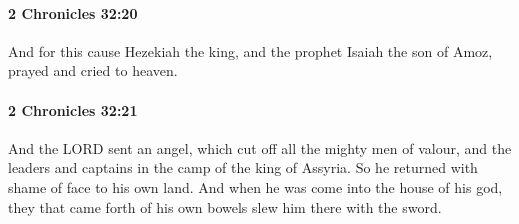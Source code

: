 		\paragraph{2 Chronicles 32:20} %
			\label{2CHRONICLES-32-20}

			And for this cause Hezekiah the king, and the prophet Isaiah the son of Amoz, prayed and cried to heaven.


		\paragraph{2 Chronicles 32:21} %
			\label{2CHRONICLES-32-21}

			And the LORD sent an angel, which cut off all the mighty men of valour, and the leaders and captains in the camp of the king of Assyria. So he returned with shame of face to his own land. And when he was come into the house of his god, they that came forth of his own bowels slew him there with the sword.

